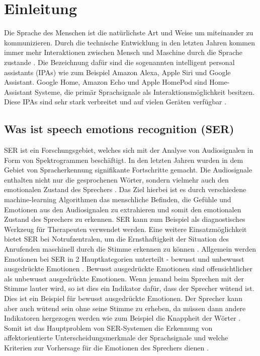 \chapter{Einleitung}

Die Sprache des Menschen ist die natürlichste Art und Weise um miteinander zu kommunizieren. Durch die technische Entwicklung in den letzten Jahren kommen immer mehr Interaktionen zwischen Mensch und Maschine durch die Sprache zustande \cite{badshah2019deep}. Die Bezeichnung dafür sind die sogenannten intelligent personal assistants (IPAs) wie zum Beispiel Amazon Alexa, Apple Siri und Google Assistant. Google Home, Amazon Echo und Apple HomePod sind Home-Assistant Systeme, die primär Sprachsignale als Interaktionsmöglichkeit besitzen. Diese IPAs sind sehr stark verbreitet und auf vielen Geräten verfügbar \cite{speech_in_hci}.


\section{Was ist speech emotions recognition (SER)}
SER ist ein Forschungsgebiet, welches sich mit der Analyse von Audiosignalen in Form von Spektrogrammen beschäftigt. In den letzten Jahren wurden in dem Gebiet von Spracherkennung signifikante Fortschritte gemacht. Die Audiosignale enthalten nicht nur die gesprochenen Wörter, sondern vielmehr auch den emotionalen Zustand des Sprechers \cite{badshah2019deep,speech_in_hci}. Das Ziel hierbei ist es durch verschiedene machine-learning Algorithmen das menschliche Befinden, die Gefühle und Emotionen aus den Audiosignalen zu extrahieren und somit den emotionalen Zustand des Sprechers zu erkennen. SER kann zum Beispiel als diagnostisches Werkzeug für Therapeuten verwendet werden. Eine weitere Einsatzmöglichkeit bietet SER bei Notrufzentralen, um die Ernsthaftigkeit der Situation des Anrufenden maschinell durch die Stimme erkennen zu können \cite{badshah2019deep}. Allgemein werden Emotionen bei SER in 2 Hauptkategorien unterteilt - bewusst und unbewusst ausgedrückte Emotionen \cite{elearning}. Bewusst ausgedrückte Emotionen sind offensichtlicher als unbewusst ausgedrückte Emotionen. Wenn jemand beim Sprechen mit der Stimme lauter wird, so ist dies ein Indikator dafür, dass der Sprecher wütend ist. Dies ist ein Beispiel für bewusst ausgedrückte Emotionen. Der Sprecher kann aber auch wütend sein ohne seine Stimme zu erheben, da müssen dann andere Indikatoren hergezogen werden wie zum Beispiel die Knappheit der Wörter \cite{elearning}. Somit ist das Hauptproblem von SER-Systemen die Erkennung von affektorientierte Unterscheidungsmerkmale der Sprachsignale und welche Kriterien zur Vorhersage für die Emotionen des Sprechers dienen \cite{badshah2019deep,speech_in_hci}.

